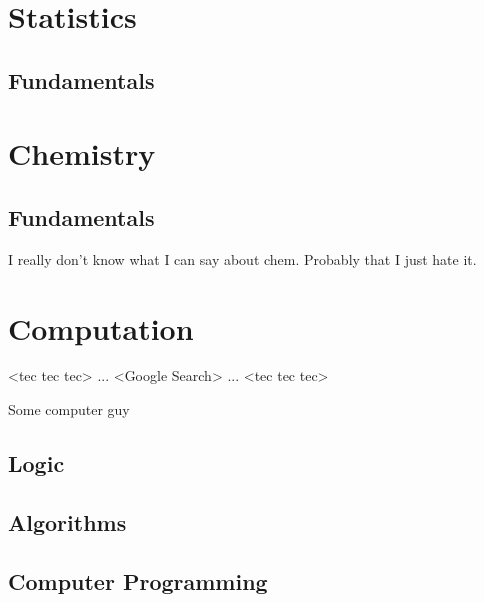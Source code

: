 \chapter{Statistics}

\section{Fundamentals}

\chapter{Chemistry}

\section{Fundamentals}
I really don't know what I can say about chem. Probably that
I just hate it.

\chapter{Computation}

\epigraph{<tec tec tec> ... <Google Search> ... <tec tec tec>}{Some computer guy}

\section{Logic}
\section{Algorithms}
\section{Computer Programming}
